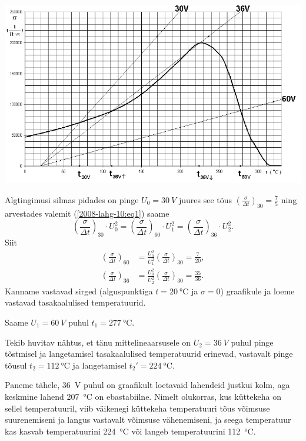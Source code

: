 \documentclass[11pt]{article}
\begin{document}
{{\begin{center}
	\includegraphics[width=\linewidth]{2008-lahg-10-lah}
\end{center}

Algtingimusi silmas pidades on pinge $U_0 = \SI{30}{V}$ juures see tõus $\left(\frac{\sigma}{\Delta t}\right)_{30}=\frac{7}{5}$ ning arvestades valemit (\ref{2008-lahg-10:eq1}) saame
\[
\left(\frac{\sigma}{\Delta t}\right)_{30} \cdot U_{0}^{2}=\left(\frac{\sigma}{\Delta t}\right)_{60} \cdot U_{1}^{2}=\left(\frac{\sigma}{\Delta t}\right)_{36} \cdot U_{2}^{2}.
\]
Siit 
\[
\begin{aligned}\left(\frac{\sigma}{\Delta t}\right)_{60} &=\frac{U_{0}^{2}}{U_{1}^{2}}\left(\frac{\sigma}{\Delta t}\right)_{30}=\frac{7}{20}, \\\left(\frac{\sigma}{\Delta t}\right)_{36} &=\frac{U_{0}^{2}}{U_{2}^{2}}\left(\frac{\sigma}{\Delta t}\right)_{30}=\frac{35}{36}. \end{aligned}
\]
Kanname vastavad sirged (alguspunktiga $t = \SI{20}{\celsius}$ ja $\sigma = 0$) graafikule ja loeme vastavad tasakaalulised temperatuurid.

Saame $U_1 = \SI{60}{V}$ puhul $t_1 = \SI{277}{\celsius}$.

Tekib huvitav nähtus, et tänu mittelineaarsusele on $U_2 = \SI{36}{V}$ puhul pinge tõstmisel ja langetamisel tasakaalulised temperatuurid erinevad, vastavalt pinge tõusul $t_2 = \SI{112}{\celsius}$ ja langetamisel $t_2' = \SI{224}{\celsius}$.

Paneme tähele, \SI{36}{V} puhul on graafikult loetavaid lahendeid justkui kolm, aga keskmine lahend \SI{207}{\celsius} on ebastabiilne. Nimelt olukorras, kus küttekeha on sellel temperatuuril, viib väikenegi küttekeha temperatuuri tõus võimsuse suurenemiseni ja langus vastavalt võimsuse vähenemiseni, ja seega temperatuur kas kasvab temperatuurini \SI{224}{\celsius} või langeb temperatuurini \SI{112}{\celsius}.
\fi
}

}
\end{document}
